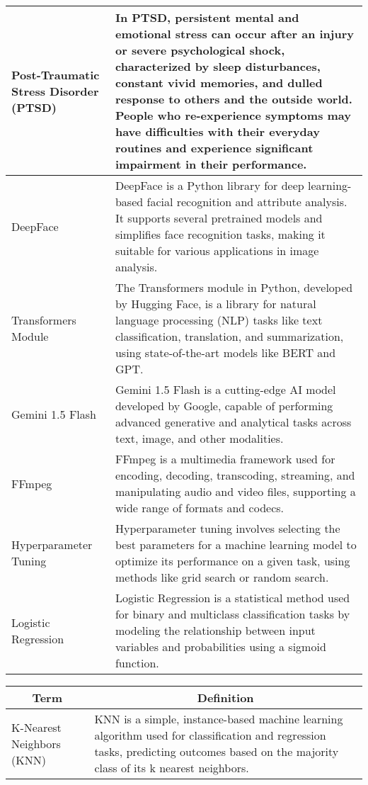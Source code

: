 \begin{center}
\begin{tabular}{|p{4cm}|p{10cm}|}
  \hline
  Post-Traumatic Stress Disorder (PTSD) & In PTSD, persistent mental and emotional stress can occur after an injury or severe psychological shock, characterized by sleep disturbances, constant vivid memories, and dulled response to others and the outside world. People who re-experience symptoms may have difficulties with their everyday routines and experience significant impairment in their performance. \\

  \hline
  DeepFace & DeepFace is a Python library for deep learning-based facial recognition and attribute analysis. It supports several pretrained models and simplifies face recognition tasks, making it suitable for various applications in image analysis. \\

  \hline
  Transformers Module & The Transformers module in Python, developed by Hugging Face, is a library for natural language processing (NLP) tasks like text classification, translation, and summarization, using state-of-the-art models like BERT and GPT. \\

  \hline
  Gemini 1.5 Flash & Gemini 1.5 Flash is a cutting-edge AI model developed by Google, capable of performing advanced generative and analytical tasks across text, image, and other modalities. \\

  \hline
  FFmpeg & FFmpeg is a multimedia framework used for encoding, decoding, transcoding, streaming, and manipulating audio and video files, supporting a wide range of formats and codecs. \\

  \hline
  Hyperparameter Tuning & Hyperparameter tuning involves selecting the best parameters for a machine learning model to optimize its performance on a given task, using methods like grid search or random search. \\

  \hline
  Logistic Regression & Logistic Regression is a statistical method used for binary and multiclass classification tasks by modeling the relationship between input variables and probabilities using a sigmoid function. \\
  \hline
\end{tabular}

\begin{tabular}{|p{4cm}|p{10cm}|}
    \hline
    \multicolumn{1}{|c|}{\textbf{Term}} & \multicolumn{1}{c|}{\textbf{Definition}} \\
  \hline
  K-Nearest Neighbors (KNN) & KNN is a simple, instance-based machine learning algorithm used for classification and regression tasks, predicting outcomes based on the majority class of its k nearest neighbors. \\


\end{tabular}
\end{center}
